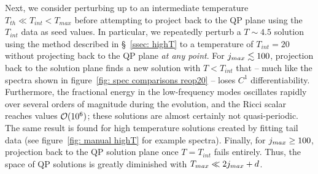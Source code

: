 \documentclass[../PhD.tex]{subfiles}
\begin{document}
Next, we consider perturbing up to an intermediate temperature $T_{th} \ll T_{int} < T_{max}$ before attempting to project back to the QP plane using the $T_{int}$ data as seed values. In particular, we repeatedly perturb a $T \sim 4.5$ solution using the method described in \S~\ref{ssec: highT} to a temperature of $T_{int} = 20$ without projecting back to the QP plane \emph{at any point}. For $j_{max} \lesssim 100$, projection back to the solution plane finds a new solution with $T < T_{int}$ that -- much like the spectra shown in figure~\ref{fig: spec comparisons reop20} -- loses $C^1$ differentiability. Furthermore, the fractional energy in the low-frequency modes oscillates rapidly over several orders of magnitude during the evolution, and the Ricci scalar reaches values $\mathcal O (10^6)$; these solutions are almost certainly not quasi-periodic. The same result is found for high temperature solutions created by fitting tail data (see figure~\ref{fig: manual highT} for example spectra). Finally, for $j_{max} \geq 100$, projection back to the QP solution plane once $T = T_{int}$ fails entirely. Thus, the space of QP solutions is greatly diminished with $T_{max} \ll 2j_{max} + d$. 



\end{document}

